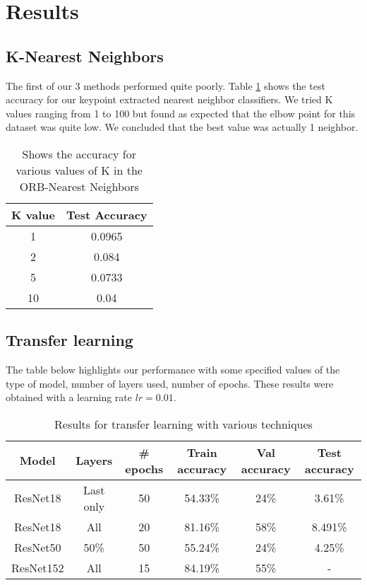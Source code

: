 \section{Results}
\subsection{K-Nearest Neighbors}

The first of our 3 methods performed quite poorly. Table \ref{fig:knn} shows the test accuracy for our keypoint extracted nearest neighbor classifiers. We tried K values ranging from 1 to 100 but found as expected that the elbow point for this dataset was quite low. We concluded that the best value was actually 1 neighbor.
\begin{table}[h!]
\centering
\begin{tabular}{|c|c|}\hline
	\textbf{K value} & \textbf{Test Accuracy}\\ \hline
	 1 & 0.0965\\ \hline
	 2  & 0.084\\ \hline
	5  & 0.0733\\ \hline
	10  & 0.04\\ \hline
\end{tabular}
\caption{\label{fig:knn} Shows the accuracy for various values of K in the ORB-Nearest Neighbors}
\end{table}

\subsection{Transfer learning}

The table below highlights our performance with some specified values of the type of model, number of layers used, number of epochs. These results were obtained with a learning rate $lr = 0.01$.

\begin{table}[h!]
	\centering
	\begin{tabular}{|c|c|c|c|c|c|}\hline
		\textbf{Model} & \textbf{Layers} & \textbf{\# epochs} & \textbf{Train accuracy} & \textbf{Val accuracy} & \textbf{Test accuracy}\\ \hline
		ResNet18  & Last only & 50 & 54.33\% & 24\% & 3.61\%\\ \hline
		ResNet18  & All & 20 & 81.16\% & 58\% & 8.491\%\\ \hline
		ResNet50 & 50\% & 50 & 55.24\% & 24\% & 4.25\%\\ \hline
		ResNet152 & All & 15 & 84.19\% & 55\% & -\\ \hline
	\end{tabular}
	\caption{\label{tab:transferresults}Results for transfer learning with various techniques}
\end{table}

